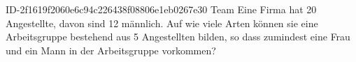 \begin{exercise}
      {ID-2f1619f2060e6c94c226438f08806e1eb0267e30}
      {Team}
  \ifproblem\problem
    Eine Firma hat 20 Angestellte, davon sind 12 männlich. Auf wie viele
    Arten können sie eine Arbeitsgruppe bestehend aus 5 Angestellten bilden,
    so dass zumindest eine Frau und ein Mann in der Arbeitsgruppe vorkommen?
  \fi
\end{exercise}
